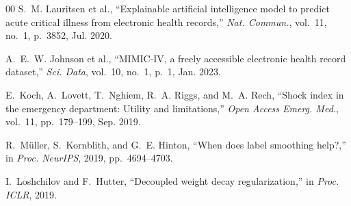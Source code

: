 \documentclass[runningheads]{llncs}
\begin{document}
\begin{thebibliography}{00}
S.~M. Lauritsen et al., ``Explainable artificial intelligence model to predict acute critical illness from electronic health records,'' \textit{Nat. Commun.}, vol.~11, no.~1, p.~3852, Jul. 2020.

A.~E.~W. Johnson et al., ``MIMIC-IV, a freely accessible electronic health record dataset,'' \textit{Sci. Data}, vol.~10, no.~1, p.~1, Jan. 2023.

E.~Koch, A.~Lovett, T.~Nghiem, R.~A. Riggs, and M.~A. Rech, ``Shock index in the emergency department: Utility and limitations,'' \textit{Open Access Emerg. Med.}, vol.~11, pp.~179--199, Sep. 2019.

R.~M\"{u}ller, S.~Kornblith, and G.~E. Hinton, ``When does label smoothing help?,'' in \textit{Proc. NeurIPS}, 2019, pp.~4694--4703.

I.~Loshchilov and F.~Hutter, ``Decoupled weight decay regularization,'' in \textit{Proc. ICLR}, 2019.

\end{thebibliography}
\end{document}
